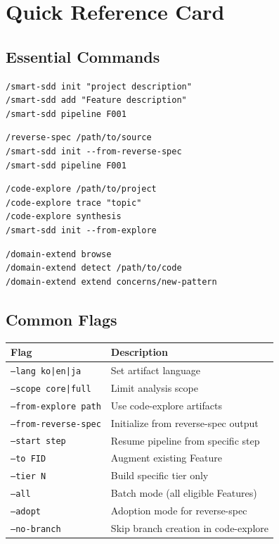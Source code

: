 \documentclass[11pt,a4paper,openright,twoside]{report}
\begin{document}
\chapter{Quick Reference Card}
\label{app:quickref}

\section{Essential Commands}

\begin{lstlisting}[title={Greenfield Workflow}]
/smart-sdd init "project description"
/smart-sdd add "Feature description"
/smart-sdd pipeline F001
\end{lstlisting}

\begin{lstlisting}[title={Rebuild Workflow}]
/reverse-spec /path/to/source
/smart-sdd init --from-reverse-spec
/smart-sdd pipeline F001
\end{lstlisting}

\begin{lstlisting}[title={Exploration Workflow}]
/code-explore /path/to/project
/code-explore trace "topic"
/code-explore synthesis
/smart-sdd init --from-explore
\end{lstlisting}

\begin{lstlisting}[title={Domain Extension}]
/domain-extend browse
/domain-extend detect /path/to/code
/domain-extend extend concerns/new-pattern
\end{lstlisting}

\section{Common Flags}

\begin{tabularx}{\textwidth}{lX}
\toprule
\textbf{Flag} & \textbf{Description} \\
\midrule
\texttt{--lang ko|en|ja} & Set artifact language \\
\texttt{--scope core|full} & Limit analysis scope \\
\texttt{--from-explore path} & Use code-explore artifacts \\
\texttt{--from-reverse-spec} & Initialize from reverse-spec output \\
\texttt{--start step} & Resume pipeline from specific step \\
\texttt{--to FID} & Augment existing Feature \\
\texttt{--tier N} & Build specific tier only \\
\texttt{--all} & Batch mode (all eligible Features) \\
\texttt{--adopt} & Adoption mode for reverse-spec \\
\texttt{--no-branch} & Skip branch creation in code-explore \\
\bottomrule
\end{tabularx}
\end{document}
